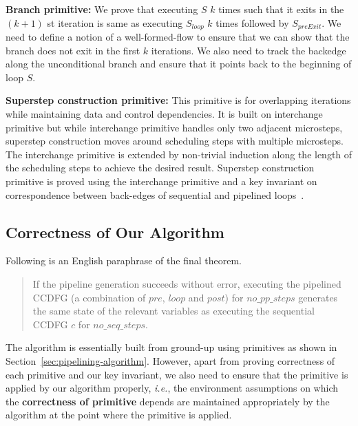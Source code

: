 {\bf Branch primitive:} We prove that executing $S$ $k$ times such that it exits 
in the $(k+1)$ st iteration is same as executing $S_{loop}$ $k$ times followed by $S_{preExit}$. 
We need to define a notion of a well-formed-flow to ensure that we can show that the 
branch does not exit in the first $k$ iterations. We also need to track the backedge along the 
unconditional branch and ensure that it points back to the beginning of loop $S$.
 
{\bf Superstep construction primitive:} This primitive is for overlapping iterations while 
maintaining data and control dependencies. It is built on interchange primitive but while interchange primitive
handles only two adjacent microsteps, superstep construction moves around scheduling steps with multiple microsteps. 
The interchange primitive is extended by non-trivial induction along the length of the scheduling steps to achieve the desired result. 
Superstep construction primitive is proved using the 
interchange primitive and a key invariant on correspondence between back-edges of sequential and pipelined loops~\cite{disha-itp14}. 

\subsection{Correctness of Our Algorithm}

Following is an English paraphrase of the final theorem.
  
\begin{quote}  
If the pipeline generation succeeds without error,
executing the pipelined CCDFG (a combination of $pre$, $loop$ and $post$) for $no\_pp\_steps$
generates the same state of the relevant variables as executing the sequential CCDFG $c$ for $no\_seq\_steps$.
\end{quote}

The algorithm is essentially built from ground-up using primitives
as shown in Section~\ref{sec:pipelining-algorithm}. However, 
apart from proving correctness of each primitive and our key 
invariant, we also need to ensure that the primitive is applied by 
our algorithm properly, {\em i.e.}, the environment
assumptions on which the {\bf correctness of primitive}
depends are maintained appropriately by the algorithm at
the point where the primitive is applied. 

